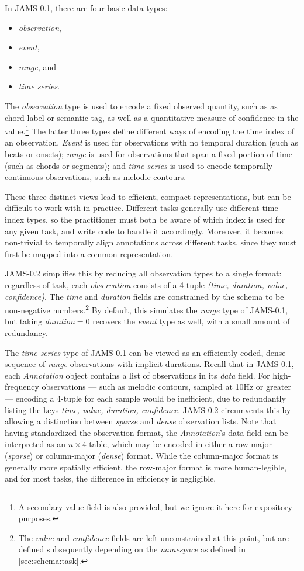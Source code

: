 \documentclass{article}
\begin{document}
In JAMS-0.1, there are four basic data types:
\begin{itemize}
    \setlength\itemsep{0em}
    \item \emph{observation},
    \item \emph{event},
    \item \emph{range}, and
    \item \emph{time series}.
\end{itemize}
The \emph{observation} type is used to encode a fixed observed quantity, such as as chord label or semantic tag, as well as a quantitative
measure of confidence in the value.\footnote{A secondary value field is also provided, but we ignore it here for expository purposes.}
The latter three types define different ways of encoding the time index of an observation.
\emph{Event} is used for observations with no temporal duration (such as beats or onsets);
\emph{range} is used for observations that span a fixed portion of time (such as chords or segments); 
and \emph{time series} is used to encode temporally continuous observations, such as melodic contours.

These three distinct views lead to efficient, compact representations, but can be difficult to work with in practice.  Different
tasks generally use different time index types, so the practitioner must both be aware of which index is 
used for any given task, and write code to handle it accordingly.
Moreover, it becomes non-trivial to temporally align annotations across different tasks, since they must first be mapped into a common representation.

JAMS-0.2 simplifies this by reducing all observation types to a single format: regardless of task, each \emph{observation} consists of a 
4-tuple \emph{(time, duration, value, confidence)}.
The \emph{time} and \emph{duration} fields are constrained by the schema to be non-negative numbers.\footnote{The \emph{value} and
\emph{confidence} fields are left unconstrained at this point, but are defined subsequently depending on the \emph{namespace} as defined
in \cref{sec:schema:task}.}
By default, this simulates the \emph{range} type of JAMS-0.1, but taking \emph{duration}$=0$ recovers the \emph{event}
type as well, with a small amount of redundancy.

The \emph{time series} type of JAMS-0.1 can be viewed as an efficiently coded, dense sequence of \emph{range} observations with implicit
durations.
Recall that in JAMS-0.1, each \emph{Annotation} object contains a list of observations in its \emph{data} field.
For high-frequency observations --- such as melodic contours, sampled at 10Hz or greater --- encoding a 4-tuple for each
sample would be inefficient, due to redundantly listing the keys \emph{time, value, duration, confidence}.
JAMS-0.2 circumvents this by allowing a distinction between \emph{sparse} and \emph{dense} observation lists.
Note that having standardized the observation format, the \emph{Annotation}'s data field can be interpreted as an $n\times 4$ table, which
may be encoded in either a row-major (\emph{sparse}) or column-major (\emph{dense}) format.
While the column-major format is generally more spatially efficient, the row-major format is more human-legible, 
and for most tasks, the difference in efficiency is negligible.
\end{document}
